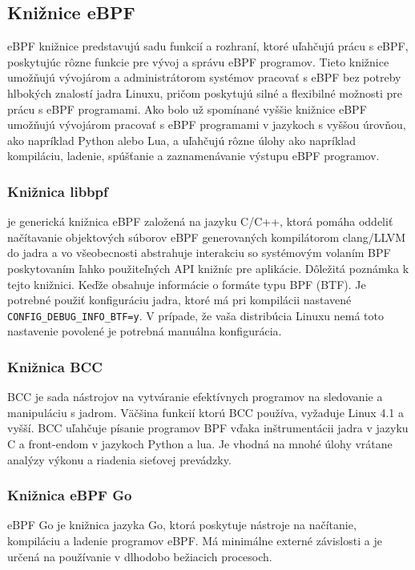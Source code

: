 \subsection{Knižnice eBPF} 
eBPF knižnice predstavujú sadu funkcií a rozhraní, ktoré uľahčujú prácu s eBPF, poskytujúc rôzne funkcie pre vývoj a správu eBPF programov. Tieto knižnice umožňujú vývojárom a administrátorom systémov pracovať s eBPF bez potreby hlbokých znalostí jadra Linuxu, pričom poskytujú silné a flexibilné možnosti pre prácu s eBPF programami. Ako bolo už spomínané vyššie knižnice eBPF umožňujú vývojárom pracovať s eBPF programami v jazykoch s vyššou úrovňou, ako napríklad Python alebo Lua, a uľahčujú rôzne úlohy ako napríklad kompiláciu, ladenie, spúšťanie a zaznamenávanie výstupu eBPF programov. 

\subsubsection{Knižnica libbpf}
je generická knižnica eBPF založená na jazyku C/C++, ktorá pomáha oddeliť načítavanie objektových súborov  eBPF generovaných kompilátorom clang/LLVM do jadra a vo 
všeobecnosti abstrahuje interakciu so systémovým volaním BPF poskytovaním ľahko použiteľných API knižníc pre aplikácie. Dôležitá poznámka k tejto knižnici. 
Keďže obsahuje informácie o formáte typu BPF (BTF). Je potrebné použiť konfiguráciu jadra, ktoré má pri kompilácii nastavené \texttt{CONFIG\_DEBUG\_INFO\_BTF=y}. 
V prípade, že vaša distribúcia Linuxu nemá toto nastavenie povolené je potrebná manuálna konfigurácia.

\subsubsection{Knižnica BCC}
BCC je sada nástrojov na vytváranie efektívnych programov na sledovanie a manipuláciu s jadrom. Väčšina funkcií ktorú BCC používa, vyžaduje Linux 4.1 a vyšší. 
BCC uľahčuje písanie programov BPF vďaka inštrumentácii jadra v jazyku C a front-endom v jazykoch Python a lua. Je vhodná na mnohé úlohy vrátane analýzy výkonu a 
riadenia sieťovej prevádzky.

\subsubsection{Knižnica eBPF Go}
eBPF Go je knižnica jazyka Go, ktorá poskytuje nástroje na načítanie, kompiláciu a ladenie programov eBPF. Má minimálne externé závislosti 
a je určená na používanie v dlhodobo bežiacich procesoch. 

